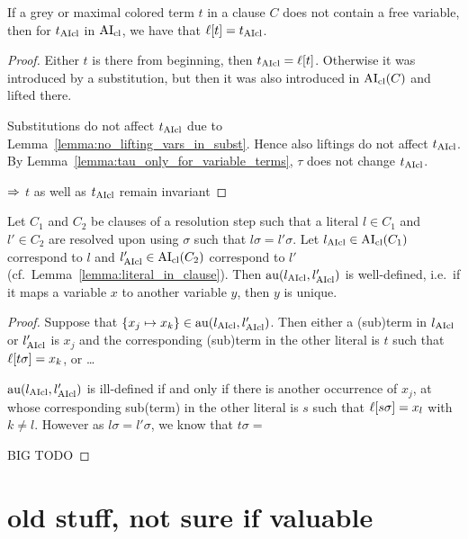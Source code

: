 \documentclass[,%
	paper=a4,%
	DIV14, 
	liststotoc,
	bibtotoc,
	draft=false,%
	numbers=noendperiod
]{scrartcl}
\begin{document}
\begin{lemma}
	\label{lemma:jka5a5halat}
	If a grey or maximal colored term $t$ in a clause $C$ does not contain a free variable, then for $t_{\operatorname{AIcl}}$ in $\operatorname{AI}_\mathrm{cl}$, we have that $\ell[t]=t_{\operatorname{AIcl}}$. 
\end{lemma}
\begin{proof}
	Either $t$ is there from beginning, then $t_{\operatorname{AIcl}} = \ell[t]$.
	Otherwise it was introduced by a substitution, but then it was also introduced in $\operatorname{AI}_\mathrm{cl}(C)$ and lifted there.

	Substitutions do not affect $t_{\operatorname{AIcl}}$ due to Lemma~\ref{lemma:no_lifting_vars_in_subst}.
	Hence also liftings do not affect $t_{\operatorname{AIcl}}$.
	By Lemma~\ref{lemma:tau_only_for_variable_terms}, $\tau$ does not change $t_{\operatorname{AIcl}}$.

	$\Rightarrow$ $t$ as well as $t_{\operatorname{AIcl}}$ remain invariant
\end{proof}


\begin{conj}
	Let $C_1$ and $C_2$ be clauses of a resolution step such that a literal $l\in C_1$ and $l' \in C_2$ are resolved upon using $\sigma$ such that $l\sigma = l'\sigma$.
	Let $l_{\operatorname{AIcl}} \in \operatorname{AI}_\mathrm{cl}(C_1)$ correspond to $l$ and $l_{\operatorname{AIcl}}' \in \operatorname{AI}_\mathrm{cl}(C_2)$ correspond to $l'$ (cf.\ Lemma~\ref{lemma:literal_in_clause}).
	Then
	$\operatorname{au}(l_{\operatorname{AIcl}}, l_{\operatorname{AIcl}}')$ is well-defined, i.e.~if it maps a variable $x$ to another variable $y$, then $y$ is unique.
\end{conj}
\begin{proof}
	Suppose that $\{x_j \mapsto x_k\} \in \operatorname{au}(l_{\operatorname{AIcl}}, l_{\operatorname{AIcl}}')$.
	Then either a (sub)term in $l_{\operatorname{AIcl}}$ or $l_{\operatorname{AIcl}}'$ is $x_j$ and the corresponding (sub)term in the other literal is $t$ such that $\ell[t\sigma] = x_k$, or \dots

	$\operatorname{au}(l_{\operatorname{AIcl}}, l_{\operatorname{AIcl}}')$ is ill-defined if and only if there is another occurrence of $x_j$, at whose corresponding sub(term) in the other literal is $s$ such that $\ell[s\sigma] = x_l$ with $k\neq l$.
	However as $l\sigma = l'\sigma$, we know that $t\sigma = $

	BIG TODO

\end{proof}



\clearpage
\section{old stuff, not sure if valuable}
\end{document}
